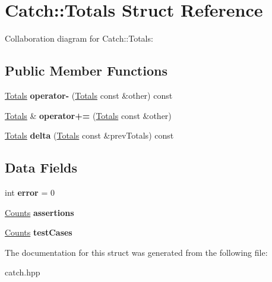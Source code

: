 \hypertarget{structCatch_1_1Totals}{}\section{Catch\+:\+:Totals Struct Reference}
\label{structCatch_1_1Totals}


Collaboration diagram for Catch\+:\+:Totals\+:
\subsection*{Public Member Functions}
\begin{DoxyCompactItemize}
\item 
\mbox{\label{structCatch_1_1Totals_a9279ed39139cb7e7b291918a6d08290e}} 
\hyperlink{structCatch_1_1Totals}{Totals} {\bfseries operator-\/} (\hyperlink{structCatch_1_1Totals}{Totals} const \&other) const
\item 
\mbox{\label{structCatch_1_1Totals_a574015076e54cc405c70b053e3356e43}} 
\hyperlink{structCatch_1_1Totals}{Totals} \& {\bfseries operator+=} (\hyperlink{structCatch_1_1Totals}{Totals} const \&other)
\item 
\mbox{\label{structCatch_1_1Totals_a1a94a654f5f3786b75695e081fc9bca2}} 
\hyperlink{structCatch_1_1Totals}{Totals} {\bfseries delta} (\hyperlink{structCatch_1_1Totals}{Totals} const \&prev\+Totals) const
\end{DoxyCompactItemize}
\subsection*{Data Fields}
\begin{DoxyCompactItemize}
\item 
\mbox{\label{structCatch_1_1Totals_a6ea14c7de7ea735a14f172a26e08a239}} 
int {\bfseries error} = 0
\item 
\mbox{\label{structCatch_1_1Totals_a885ded66df752147b30c3d45aa602ec9}} 
\hyperlink{structCatch_1_1Counts}{Counts} {\bfseries assertions}
\item 
\mbox{\label{structCatch_1_1Totals_adb195fe477aedee2ecea88c888f16506}} 
\hyperlink{structCatch_1_1Counts}{Counts} {\bfseries test\+Cases}
\end{DoxyCompactItemize}


The documentation for this struct was generated from the following file\+:\begin{DoxyCompactItemize}
\item 
catch.\+hpp\end{DoxyCompactItemize}

